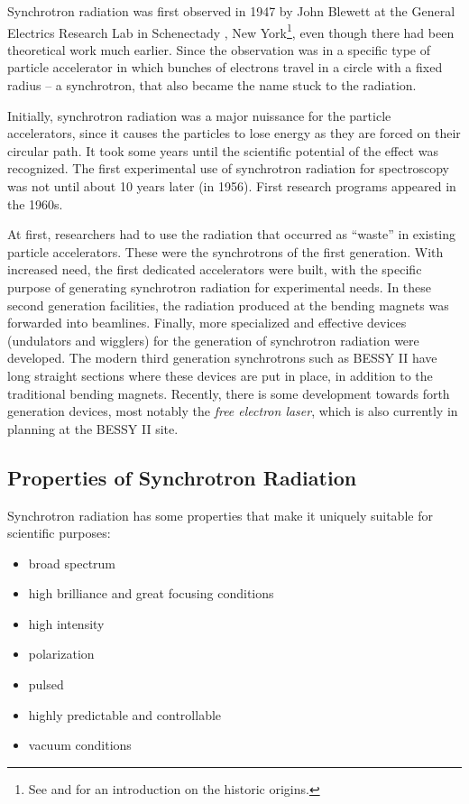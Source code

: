 \documentclass[a4paper,10pt]{article}
\begin{document}
    Synchrotron radiation was first observed in 1947 by John Blewett at the
General Electrics Research Lab in Schenectady , New York\footnote{See
\citep{blewett1998} and \citep{robinson2000} for an introduction on the historic
origins.}, even though there had been theoretical work much earlier. Since the
observation was in a specific type of particle accelerator in which bunches of
electrons travel in a circle with a fixed radius -- a synchrotron, that
also became the name stuck to the radiation.

    Initially, synchrotron radiation was a major nuissance for the particle
accelerators, since it causes the particles to lose energy as they are forced
on their circular path. It took some years until the scientific potential of
the effect was recognized. The first experimental use of synchrotron
radiation for spectroscopy was not until about 10 years later (in 1956). First
research programs appeared in the 1960s.

    At first, researchers had to use the radiation that occurred as ``waste'' in
existing particle accelerators. These were the synchrotrons of the first
generation. With increased need, the first dedicated accelerators were built,
with the specific purpose of generating synchrotron radiation for experimental
needs. In these second generation facilities, the radiation produced at the
bending magnets was forwarded into beamlines. Finally, more specialized and
effective devices (undulators and wigglers) for the generation of synchrotron
radiation were developed. The modern third generation synchrotrons such as
BESSY II have long straight sections where these devices are put in place, in
addition to the traditional bending magnets. Recently, there is some development
towards forth generation devices, most notably the \emph{free electron laser},
which is also currently in planning at the BESSY II site.

    \subsection{Properties of Synchrotron Radiation}
    \label{Properties of Synchrotron Radiation}

    Synchrotron radiation has some properties that make it uniquely suitable
for scientific purposes:
\begin{itemize}
    \item broad spectrum
    \item high brilliance and great focusing conditions
    \item high intensity
    \item polarization
    \item pulsed
    \item highly predictable and controllable
    \item vacuum conditions
\end{itemize}
\end{document}

